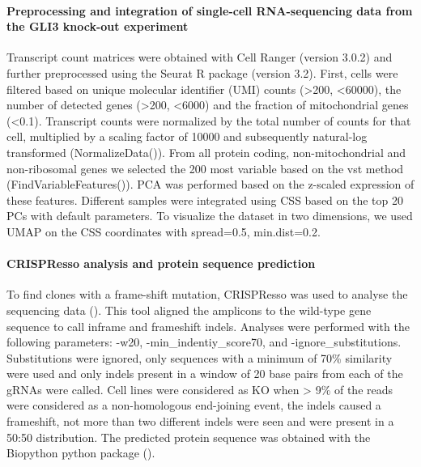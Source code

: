 \paragraph{Preprocessing and integration of single-cell RNA-sequencing data from the GLI3 knock-out experiment}
Transcript count matrices were obtained with Cell Ranger (version 3.0.2) and further preprocessed using the Seurat R package (version 3.2). First, cells were filtered based on unique molecular identifier (UMI) counts (>200, <60000), the number of detected genes (>200, <6000) and the fraction of mitochondrial genes (<0.1). Transcript counts were normalized by the total number of counts for that cell, multiplied by a scaling factor of 10000 and subsequently natural-log transformed (NormalizeData()). From all protein coding, non-mitochondrial and non-ribosomal genes we selected the 200 most variable based on the vst method (FindVariableFeatures()).  PCA was performed based on the z-scaled expression of these features. Different samples were integrated using CSS based on the top 20 PCs with default parameters. To visualize the dataset in two dimensions, we used  UMAP on the CSS coordinates with spread=0.5, min.dist=0.2.
 
\paragraph{CRISPResso analysis and protein sequence prediction}
To find clones with a frame-shift mutation, CRISPResso was used to analyse the sequencing data (\cite{pinello_analyzing_2016}). This tool aligned the amplicons to the wild-type gene sequence to call inframe and frameshift indels. Analyses were performed with the following parameters: -w20, -min\_indentiy\_score70, and -ignore\_substitutions. Substitutions were ignored, only sequences with a minimum of 70\% similarity were used and only indels present in a window of 20 base pairs from each of the gRNAs were called. Cell lines were considered as KO when > 9\% of the reads were considered as a non-homologous end-joining event, the indels caused a frameshift, not more than two different indels were seen and were present in a 50:50 distribution. The predicted protein sequence was obtained with the Biopython python package (\cite{cock_biopython_2009}).
 

